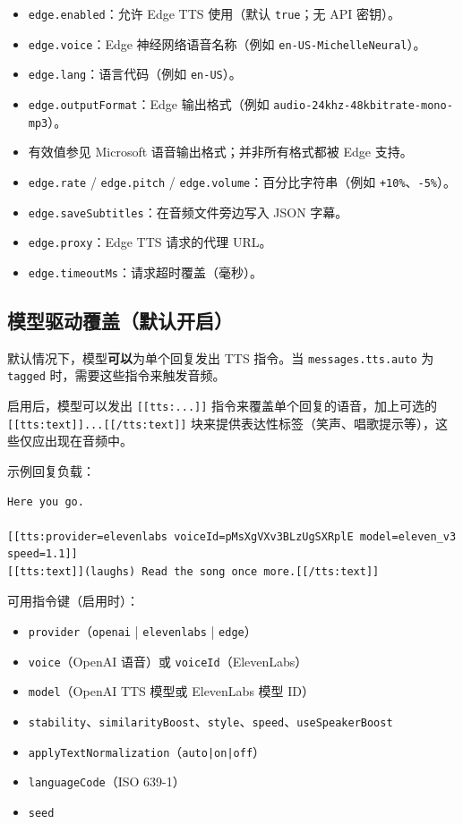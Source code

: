 \begin{itemize}
  \item \texttt{edge.enabled}：允许 Edge TTS 使用（默认 \texttt{true}；无 API 密钥）。
  \item \texttt{edge.voice}：Edge 神经网络语音名称（例如 \texttt{en-US-MichelleNeural}）。
  \item \texttt{edge.lang}：语言代码（例如 \texttt{en-US}）。
  \item \texttt{edge.outputFormat}：Edge 输出格式（例如 \texttt{audio-24khz-48kbitrate-mono-mp3}）。
  \item 有效值参见 Microsoft 语音输出格式；并非所有格式都被 Edge 支持。
  \item \texttt{edge.rate} / \texttt{edge.pitch} / \texttt{edge.volume}：百分比字符串（例如 \texttt{+10\%}、\texttt{-5\%}）。
  \item \texttt{edge.saveSubtitles}：在音频文件旁边写入 JSON 字幕。
  \item \texttt{edge.proxy}：Edge TTS 请求的代理 URL。
  \item \texttt{edge.timeoutMs}：请求超时覆盖（毫秒）。
\end{itemize}


\subsection{模型驱动覆盖（默认开启）}


默认情况下，模型\textbf{可以}为单个回复发出 TTS 指令。当 \texttt{messages.tts.auto} 为 \texttt{tagged} 时，需要这些指令来触发音频。

启用后，模型可以发出 \texttt{[[tts:...]]} 指令来覆盖单个回复的语音，加上可选的 \texttt{[[tts:text]]...[[/tts:text]]} 块来提供表达性标签（笑声、唱歌提示等），这些仅应出现在音频中。

示例回复负载：

\begin{lstlisting}
Here you go.

[[tts:provider=elevenlabs voiceId=pMsXgVXv3BLzUgSXRplE model=eleven_v3 speed=1.1]]
[[tts:text]](laughs) Read the song once more.[[/tts:text]]
\end{lstlisting}


可用指令键（启用时）：

\begin{itemize}
  \item \texttt{provider}（\texttt{openai} | \texttt{elevenlabs} | \texttt{edge}）
  \item \texttt{voice}（OpenAI 语音）或 \texttt{voiceId}（ElevenLabs）
  \item \texttt{model}（OpenAI TTS 模型或 ElevenLabs 模型 ID）
  \item \texttt{stability}、\texttt{similarityBoost}、\texttt{style}、\texttt{speed}、\texttt{useSpeakerBoost}
  \item \texttt{applyTextNormalization}（\texttt{auto|on|off}）
  \item \texttt{languageCode}（ISO 639-1）
  \item \texttt{seed}
\end{itemize}


